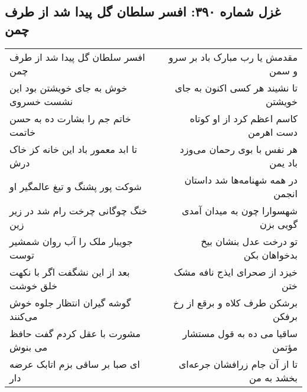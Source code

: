 \begin{center}
\section*{غزل شماره ۳۹۰: افسر سلطان گل پیدا شد از طرف چمن}
\label{sec:sh390}
\begin{longtable}{l p{0.5cm} r}
افسر سلطان گل پیدا شد از طرف چمن
&&
مقدمش یا رب مبارک باد بر سرو و سمن
\\
خوش به جای خویشتن بود این نشست خسروی
&&
تا نشیند هر کسی اکنون به جای خویشتن
\\
خاتم جم را بشارت ده به حسن خاتمت
&&
کاسم اعظم کرد از او کوتاه دست اهرمن
\\
تا ابد معمور باد این خانه کز خاک درش
&&
هر نفس با بوی رحمان می‌وزد باد یمن
\\
شوکت پور پشنگ و تیغ عالمگیر او
&&
در همه شهنامه‌ها شد داستان انجمن
\\
خنگ چوگانی چرخت رام شد در زیر زین
&&
شهسوارا چون به میدان آمدی گویی بزن
\\
جویبار ملک را آب روان شمشیر توست
&&
تو درخت عدل بنشان بیخ بدخواهان بکن
\\
بعد از این نشگفت اگر با نکهت خلق خوشت
&&
خیزد از صحرای ایذج نافه مشک ختن
\\
گوشه گیران انتظار جلوه خوش می‌کنند
&&
برشکن طرف کلاه و برقع از رخ برفکن
\\
مشورت با عقل کردم گفت حافظ می بنوش
&&
ساقیا می ده به قول مستشار مؤتمن
\\
ای صبا بر ساقی بزم اتابک عرضه دار
&&
تا از آن جام زرافشان جرعه‌ای بخشد به من
\\
\end{longtable}
\end{center}
